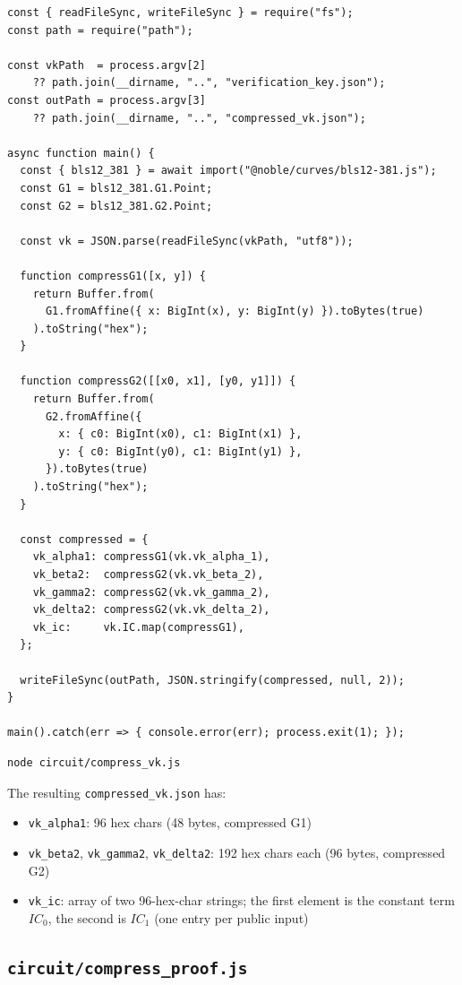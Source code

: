 \begin{verbatim}
const { readFileSync, writeFileSync } = require("fs");
const path = require("path");

const vkPath  = process.argv[2]
    ?? path.join(__dirname, "..", "verification_key.json");
const outPath = process.argv[3]
    ?? path.join(__dirname, "..", "compressed_vk.json");

async function main() {
  const { bls12_381 } = await import("@noble/curves/bls12-381.js");
  const G1 = bls12_381.G1.Point;
  const G2 = bls12_381.G2.Point;

  const vk = JSON.parse(readFileSync(vkPath, "utf8"));

  function compressG1([x, y]) {
    return Buffer.from(
      G1.fromAffine({ x: BigInt(x), y: BigInt(y) }).toBytes(true)
    ).toString("hex");
  }

  function compressG2([[x0, x1], [y0, y1]]) {
    return Buffer.from(
      G2.fromAffine({
        x: { c0: BigInt(x0), c1: BigInt(x1) },
        y: { c0: BigInt(y0), c1: BigInt(y1) },
      }).toBytes(true)
    ).toString("hex");
  }

  const compressed = {
    vk_alpha1: compressG1(vk.vk_alpha_1),
    vk_beta2:  compressG2(vk.vk_beta_2),
    vk_gamma2: compressG2(vk.vk_gamma_2),
    vk_delta2: compressG2(vk.vk_delta_2),
    vk_ic:     vk.IC.map(compressG1),
  };

  writeFileSync(outPath, JSON.stringify(compressed, null, 2));
}

main().catch(err => { console.error(err); process.exit(1); });
\end{verbatim}

\begin{verbatim}
node circuit/compress_vk.js
\end{verbatim}

The resulting \texttt{compressed\_vk.json} has:

\begin{itemize}
  \item \texttt{vk\_alpha1}: 96 hex chars (48 bytes, compressed G1)
  \item \texttt{vk\_beta2}, \texttt{vk\_gamma2}, \texttt{vk\_delta2}: 192 hex chars each (96 bytes, compressed G2)
  \item \texttt{vk\_ic}: array of two 96-hex-char strings; the first element
        is the constant term $IC_0$, the second is $IC_1$ (one entry per public input)
\end{itemize}

\subsection*{\texttt{circuit/compress\_proof.js}}

